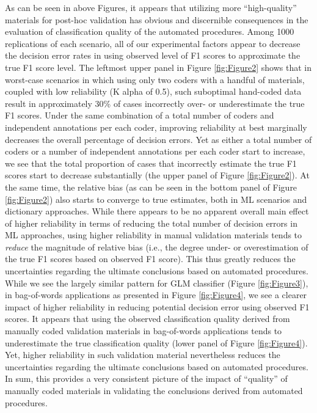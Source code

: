 \documentclass[man, floatsintext, 12pt, a4paper, noextraspace]{apa6}
\begin{document}
    As can be seen in above Figures, it appears that utilizing more \enquote{high-quality} materials for post-hoc validation has obvious and discernible consequences in the evaluation of classification quality of the automated procedures. Among 1000 replications of each scenario, all of our experimental factors appear to decrease the decision error rates in using observed level of F1 scores to approximate the true F1 score level. The leftmost upper panel in Figure \ref{fig:Figure2} shows that in worst-case scenarios in which using only two coders with a handful of materials, coupled with low reliability (K alpha of 0.5), such suboptimal hand-coded data result in approximately 30\% of cases incorrectly over- or underestimate the true F1 scores. Under the same combination of a total number of coders and independent annotations per each coder, improving reliability at best marginally decreases the overall percentage of decision errors. Yet as either a total number of coders or a number of independent annotations per each coder start to increase, we see that the total proportion of cases that incorrectly estimate the true F1 scores start to decrease substantially (the upper panel of Figure \ref{fig:Figure2}). At the same time, the relative bias (as can be seen in the bottom panel of Figure \ref{fig:Figure2}) also starts to converge to true estimates, both in ML scenarios and dictionary approaches. While there appears to be no apparent overall main effect of higher reliability in terms of reducing the total number of decision errors in ML approaches, using higher reliability in manual validation materials tends to \textit{reduce} the magnitude of relative bias (i.e., the degree under- or overestimation of the true F1 scores based on observed F1 score). This thus greatly reduces the uncertainties regarding the ultimate conclusions based on automated procedures. While we see the largely similar pattern for GLM classifier (Figure \ref{fig:Figure3}), in bag-of-words applications as presented in Figure \ref{fig:Figure4}, we see a clearer impact of higher reliability in reducing potential decision error using observed F1 scores. It appears that using the observed classification quality derived from manually coded validation materials in bag-of-words applications tends to underestimate the true classification quality (lower panel of Figure \ref{fig:Figure4}). Yet, higher reliability in such validation material nevertheless reduces the uncertainties regarding the ultimate conclusions based on automated procedures. In sum, this provides a very consistent picture of the impact of \enquote{quality} of manually coded materials in validating the conclusions derived from automated procedures.   
\end{document}
